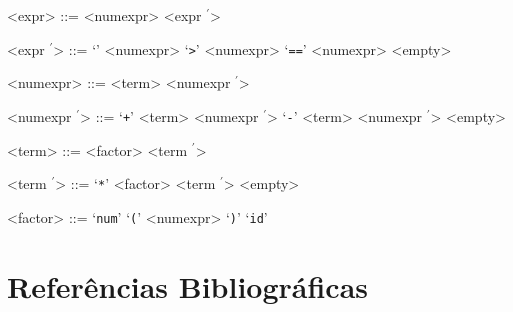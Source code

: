 \documentclass[12pt]{article}
\newcommand{\pprime}{\ensuremath{^{\prime}}}
\begin{document}
\begin{multicols}{2}
\begin{grammar}
<expr> ::= <numexpr> <expr \pprime>

<expr \pprime> ::= ‘\texttt{}’ <numexpr>
  \alt ‘\texttt{>}’ <numexpr>
  \alt ‘\texttt{==}’ <numexpr>
  \alt <empty>

<numexpr> ::= <term> <numexpr \pprime>

<numexpr \pprime> ::= ‘\texttt{+}’ <term> <numexpr \pprime>
  \alt ‘\texttt{-}’ <term> <numexpr \pprime>
  \alt <empty>

<term> ::= <factor> <term \pprime>

<term \pprime> ::= ‘\texttt{*}’ <factor> <term \pprime>
  \alt <empty>

<factor> ::= ‘\texttt{num}’
  \alt ‘\texttt{(}’ <numexpr> ‘\texttt{)}’
  \alt ‘\texttt{id}’
\end{grammar}
\end{multicols}

\newpage
\section{Referências Bibliográficas}


\end{document}
